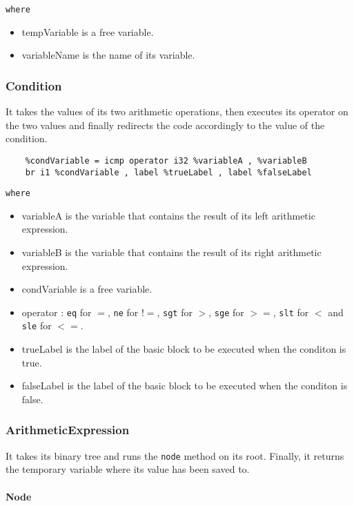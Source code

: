 \documentclass{article}
\begin{document}
\noindent\texttt{where}

\begin{itemize}
    \item tempVariable is a free variable.
    \item variableName is the name of its variable.
\end{itemize}

\subsubsection{Condition}
It takes the values of its two arithmetic operations, then executes its operator on the two values and finally redirects the code accordingly to the value of the condition.
\begin{lstlisting}
    %condVariable = icmp operator i32 %variableA , %variableB
    br i1 %condVariable , label %trueLabel , label %falseLabel
\end{lstlisting}

\noindent\texttt{where}

\begin{itemize}
    \item variableA is the variable that contains the result of its left arithmetic expression.
    \item variableB is the variable that contains the result of its right arithmetic expression.
    \item condVariable is a free variable.
    \item operator : \texttt{eq} for $=$, \texttt{ne} for $!=$, \texttt{sgt} for $>$, \texttt{sge} for $>=$, \texttt{slt} for $<$ and \texttt{sle} for $<=$.
    \item trueLabel is the label of the basic block to be executed when the conditon is true.
    \item falseLabel is the label of the basic block to be executed when the conditon is false. 
\end{itemize}

\subsubsection{ArithmeticExpression}
It takes its binary tree and runs the \texttt{node} method on its root. Finally, it returns the temporary variable where its value has been saved to.

\paragraph{Node}
\end{document}
